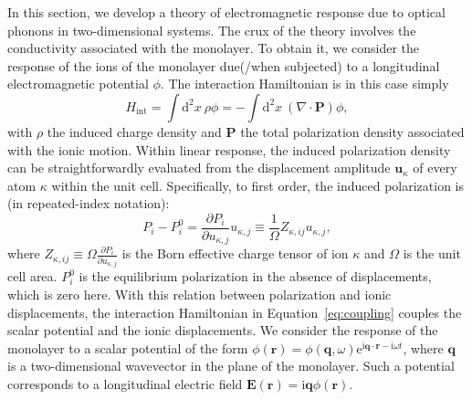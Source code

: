 \documentclass[aps,prb,twocolumn,
	           groupedaddress,superscriptaddress,
               amsfonts,amssymb,amsmath,floatfix,
	           citeautoscript]{revtex4-1}
\newcommand{\iu}{\mathrm{i}}
\newcommand{\e}{\mathrm{e}}
\newcommand{\dd}{\mathrm{d}}
\begin{document}
In this section, we develop a theory of electromagnetic response due to optical phonons in two-dimensional systems. The crux of the theory involves the conductivity associated with the monolayer. To obtain it, we consider the response of the ions of the monolayer due(/when subjected) to a longitudinal electromagnetic potential $\phi$. The interaction Hamiltonian is in this case simply
\begin{equation}
    H_{\mathrm{int}} = \int \dd^2x ~\rho \phi = -\int \dd^2x~ (\nabla\cdot\mathbf{P})\phi,
    \label{eq:coupling}
\end{equation} 
with $\rho$ the induced charge density and $\mathbf{P}$ the total polarization density associated with the ionic motion. 
Within linear response, the induced polarization density can be straightforwardly evaluated from the displacement amplitude $\mathbf{u}_{\kappa}$ of every atom $\kappa$ within the unit cell. Specifically, to first order, the induced polarization is (in repeated-index notation):
\begin{equation}
    P_i - P_i^{0} = \frac{\partial P_i}{\partial u_{\kappa,j}}u_{\kappa,j} \equiv \frac{1}{\Omega}Z_{\kappa,ij}u_{\kappa,j},
\end{equation} 
where $Z_{\kappa,ij} \equiv \Omega\frac{\partial P_i}{\partial u_{\kappa,j}} $ is the Born effective charge tensor of ion $\kappa$ and $\Omega$ is the unit cell area. $P_i^{0}$ is the equilibrium polarization in the absence of displacements, which is zero here. With this relation between polarization and ionic displacements, the interaction Hamiltonian in Equation~\eqref{eq:coupling} couples the scalar potential and the ionic displacements.  We consider the response of the monolayer to a scalar potential of the form $\phi(\mathbf{r}) = \phi(\mathbf{q},\omega)\e^{\iu\mathbf{q}\cdot\mathbf{r}-\iu\omega t}$, where $\mathbf{q}$ is a two-dimensional wavevector in the plane of the monolayer. Such a potential corresponds to a longitudinal electric field  $\mathbf{E}(\mathbf{r}) = \iu\mathbf{q}\phi(\mathbf{r})$. 
\end{document}
